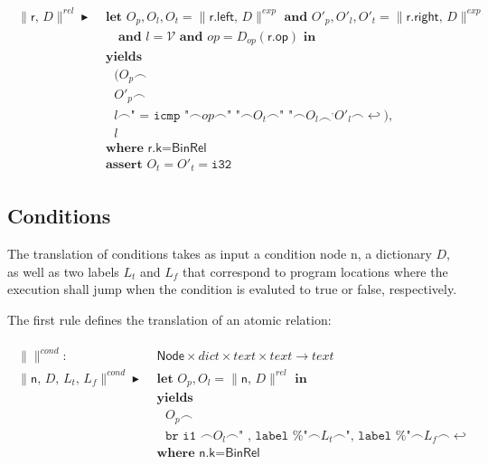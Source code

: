 \documentclass{article}
\newcommand{\trad}[2]{\ensuremath{\lVert \textsf{#1} \rVert^{\textit{#2}}}}
\newcommand{\nl}[0]{\ensuremath{\hookleftarrow}}
\DeclareMathOperator{\conc}{\smallfrown}
\DeclareMathOperator{\isdef}{\blacktriangleright}
\begin{document}
\begin{framed}
\begin{align}
\begin{split}
  \trad{r, $D$}{rel} \isdef & \textbf{ let } O_p, O_l, O_t =
  \trad{r.left, $D$}{exp} \textbf{ and }
  O'_p, O'_l, O'_t = \trad{r.right, $D$}{exp} \\
  & \quad \textbf{ and } l = \mathcal{V} \textbf{ and } op = D_{op}(\textsf{r.op}) \textbf{ in } \\
  & \textbf{ yields} \\
  & \quad (O_p \conc \\
  & \quad O'_p \conc \\
  & \quad l \conc \texttt{" = icmp "} \conc op \conc \texttt{" "} \conc O_t \conc \texttt{" "} \conc O_l \conc^, O'_l \conc \nl), \\
  & \quad l \\
  & \textbf{ where } \textsf{r.k} = \textsf{BinRel} \\
  & \textbf{ assert } O_t = O'_t = \texttt{i32}
\end{split}
\end{align}
\end{framed}
   
\subsection{Conditions}
\label{sec:cond}

The translation of conditions takes as input a condition node
\textsf{n}, a dictionary $D$, as well as two labels $L_t$ and $L_f$
that correspond to program locations where the execution shall jump
when the condition is evaluted to true or false, respectively.

The first rule defines the translation of an atomic relation:
\begin{framed}
\begin{align}
\begin{split}
  \trad{}{cond} : & \textsf{ Node} \times dict \times text \times text \rightarrow text \\
  \trad{n, $D$, $L_t$, $L_f$}{cond} \isdef
  & \textbf{ let } O_p, O_l = \trad{n, $D$}{rel} \textbf{ in } \\
  & \textbf{ yields} \\
  & \quad O_p \conc \\
  & \quad \texttt{br i1 } \conc O_l \conc \texttt{" , label \%"} \conc L_t \conc \texttt{", label \%"} \conc L_f \conc \nl  \\
  & \textbf{ where } \textsf{n.k} = \textsf{BinRel}
\end{split}
\end{align}
\end{framed}
\end{document}
